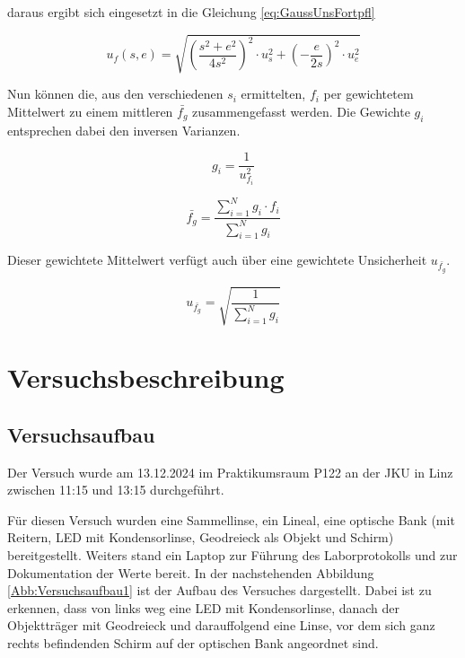 \documentclass[a4paper,12pt]{article}
\begin{document}
daraus ergibt sich eingesetzt in die Gleichung \ref{eq:GaussUnsFortpfl}

\begin{equation}
    \label{eq:BesselBrennwUnsFortpfl}
    u_f(s,e) = \sqrt{\left(\frac{s^2+e^2}{4s^2}\right)^2 \cdot u_s^2 + \left(-\frac{e}{2s}\right)^2 \cdot u_e^2}
\end{equation}

Nun können die, aus den verschiedenen $s_i$ ermittelten, $f_i$ per gewichtetem Mittelwert zu einem
mittleren $\bar{f_g}$ zusammengefasst werden. Die Gewichte $g_i$ entsprechen dabei den inversen
Varianzen.

\begin{equation}
    \label{eq:Gewicht}
    g_i = \frac{1}{u_{f_i}^2}
\end{equation}

\begin{equation}
    \label{eq:Mittelwert}
    \bar{f_g} = \frac{\sum_{i=1}^{N} g_i \cdot f_i}{\sum_{i=1}^{N} g_i}
\end{equation}

Dieser gewichtete Mittelwert verfügt auch über eine gewichtete Unsicherheit $u_{\bar{f_g}}$.

\begin{equation}
    \label{eq:GewichtUnsicherheit}
    u_{\bar{f_g}} = \sqrt{\frac{1}{\sum_{i=1}^{N} g_i}}
\end{equation}

\section{Versuchsbeschreibung}
\subsection{Versuchsaufbau}

Der Versuch wurde am 13.12.2024 im Praktikumsraum P122 an der JKU in Linz zwischen 11:15 und
13:15 durchgeführt.

Für diesen Versuch wurden eine Sammellinse, ein Lineal, eine optische Bank (mit Reitern, LED
mit Kondensorlinse, Geodreieck als Objekt und Schirm) bereitgestellt.
Weiters stand ein Laptop zur Führung des Laborprotokolls und zur Dokumentation der Werte bereit.
In der nachstehenden Abbildung \ref{Abb:Versuchsaufbau1} ist der Aufbau des Versuches dargestellt.
Dabei ist zu erkennen, dass von links weg eine LED mit Kondensorlinse, danach der Objektträger
mit Geodreieck und darauffolgend eine Linse, vor dem sich ganz rechts befindenden Schirm auf der
optischen Bank angeordnet sind.
\end{document}
